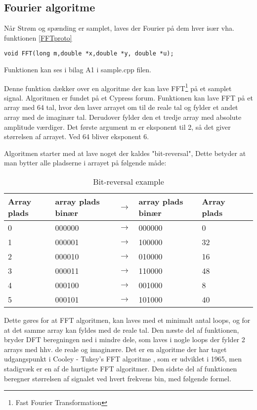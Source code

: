 
\subsection{Fourier algoritme}
Når Strøm og spænding er samplet, laves der Fourier på dem hver især vha. funktionen \ref{FFTproto}

\begin{lstlisting}
void FFT(long m,double *x,double *y, double *u);
\end{lstlisting}
Funktionen kan ses i bilag A1 i sample.cpp filen.

Denne funktion dækker over en algoritme der kan lave FFT\footnote{Fast Fourier Transformation} på et samplet signal. Algoritmen er fundet på et Cypress forum\cite{FFTalgo}. Funktionen kan lave FFT på et array med 64 tal, hvor den laver arrayet om til de reale tal og fylder et andet array med de imaginær tal. Derudover fylder den et tredje array med absolute amplitude værdiger. Det første argument m er eksponent til 2, så det giver størrelsen af arrayet. Ved 64 bliver eksponent 6.

Algoritmen starter med at lave noget der kaldes "bit-reversal", Dette betyder at man bytter alle pladserne i arrayet på følgende måde:

\begin{table}[H] 
	\centering 
	\begin{tabular}{|l|l|l|l|l|l|} %
		\hline 	%
		Array plads		&array plads binær & $\rightarrow$ 	&array plads binær    	&Array plads 	 \\ \hline 	%
		0		 	& 000000  				& $\rightarrow$ &000000				&0 	 \\ \hline 
		1		 	& 000001  				& $\rightarrow$ &100000				&32	 \\ \hline
		2		 	& 000010  				& $\rightarrow$ &010000				&16	 \\ \hline
		3		 	& 000011  				& $\rightarrow$ &110000				&48	 \\ \hline 
		4		 	& 000100  				& $\rightarrow$ &001000				&8	 \\ \hline 
		5		 	& 000101  				& $\rightarrow$ &101000				&40 \\ \hline   
	\end{tabular} 
	\caption{Bit-reversal example} 
	\label{tab:bit} 
\end{table}
Dette gøres for at FFT algoritmen, kan laves med et minimalt antal loops, og for at det samme array kan fyldes med de reale tal. Den næste del af funktionen, bryder DFT beregningen ned i mindre dele, som laves i nogle loops der fylder 2 arrays med hhv. de reale og imaginære. Det er en algoritme der har taget udgangspunkt i Cooley - Tukey's FFT algoritme \cite{Cooley}, som er udviklet i 1965, men stadigvæk er en af de hurtigste FFT algoritmer. Den sidste del af funktionen beregner størrelsen af signalet ved hvert frekvens bin, med følgende formel.




